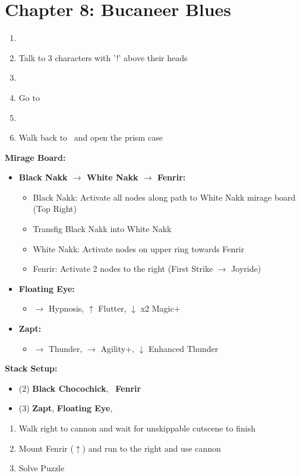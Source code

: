 \chapter{Chapter 8: Bucaneer Blues}
\begin{enumerate}
	\item \cs\
	\item Talk to 3 characters with '!' above their heads
	\item \cs\
	\item Go to 
	\item \cs\
	\item Walk back to \gate\ and open the prism case
\end{enumerate}
\begin{menu}
\textbf{Mirage Board:}
	\begin{itemize}
		\item \textbf{Black Nakk $\rightarrow$ White Nakk $\rightarrow$ Fenrir:}
			\begin{itemize}
				\item Black Nakk: Activate all nodes along path to White Nakk mirage board (Top Right)
				\item Transfig Black Nakk into White Nakk
				\item White Nakk: Activate nodes on upper ring towards Fenrir
				\item Fenrir: Activate 2 nodes to the right (First Strike $\rightarrow$ Joyride)
			\end{itemize}
		\item \textbf{Floating Eye:}
			\begin{itemize}
				\item $\rightarrow$ Hypnosis, $\uparrow$ Flutter, $\downarrow$ x2 Magic+
			\end{itemize}
		\item \textbf{Zapt:}
			\begin{itemize}
				\item $\rightarrow$ Thunder, $\rightarrow$ Agility+, $\downarrow$ Enhanced Thunder
			\end{itemize}
	\end{itemize}
\textbf{Stack Setup:}
	\begin{itemize}
		\item (2) \textbf{Black Chocochick}, \lann\, \textbf{Fenrir}
		\item (3) \textbf{Zapt}, \textbf{Floating Eye}, \reynn\
	\end{itemize}
\end{menu}
\begin{enumerate}[resume]
	\item Walk right to cannon and wait for unskippable cutscene to finish
	\item Mount Fenrir ($\uparrow$) and run to the right and use cannon
	\item Solve Puzzle
\end{enumerate}
